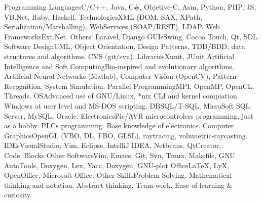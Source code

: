 \documentclass[11pt,a4paper,sans]{moderncv}
\begin{document}
\cvcomputer
	{Programming Languages}{C/C++, Java, C\#, Objetive-C, Asm, Python, PHP, JS,
VB.Net, Ruby, Haskell.}
	{Technologies}{XML (DOM, SAX, XPath, Serialization/Marshalling), WebServices (SOAP/REST), LDAP.}
\cvcomputer
	{Web Frameworks}{Ext.Net. Others: Laravel, Django}
	{GUIs}{Swing, Cocoa Touch, Qt, SDL.}
\cvcomputer
	{Software Design}{UML, Object Orientation, Design Patterns, TDD/BDD, data
structures and algorithms, CVS (git/svn).}
	{Libraries}{Xunit, JUnit}
\cvcomputer
	{Artificial Intelligence and Soft Computing}{Bio-inspired and evolutionary
algorithms, Artificial Neural Networks (Matlab), Computer Vision (OpenCV),
Pattern Recognition, System Simulation.}
	{Parallel Programming}{MPI, OpenMP, OpenCL, Threads.}
\cvcomputer
	{OS}{Advanced use of GNU/Linux, *nix CLI and kernel compiation. Windows at
user level and MS-DOS scripting.}
	{DB}{SQL/T-SQL, MicroSoft SQL Server, MySQL, Oracle.}
\cvcomputer
	{Electronics}{Pic/AVR microcontrolers programming, just as a hobby. PLCs
programming. Base knowledge of electronics.}
	{Computer Graphics}{OpenGL (VBO, DL, FBO, GLSL), raytracing,
volumetric-raycasting.}
\cvcomputer
	{IDEs}{VisualStudio, Vim, Eclipse, IntelliJ IDEA, Netbeans, QtCreator,
Code::Blocks}
	{Other Software}{Vim, Emacs, Git, Svn, Tmux, Makefile, GNU AutoTools, Doxygen,
Lex, Yacc, Doxygen, GNU-plot}
\cvcomputer
	{Office}{\LaTeX, LyX, OpenOffice, Microsoft Office.}
	{Other Skills}{Problem Solving. Mathematical thinking and notation.
Abstract thinking. Team work. Ease of learning \& curiosity.}

\end{document}
